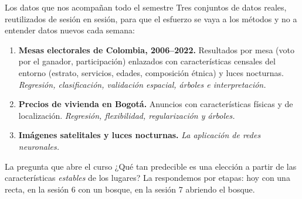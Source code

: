 \documentclass{beamer}
\newcommand{\1}{\mathbb{I}}
\begin{document}
\begin{frame}{Los datos que nos acompañan todo el semestre}
\small
Tres conjuntos de datos reales, reutilizados de sesión en sesión, para que el esfuerzo se vaya a los métodos y no a entender datos nuevos cada semana:
\pause
\begin{enumerate}\itemsep6pt
  \item \textbf{Mesas electorales de Colombia, 2006--2022.} Resultados por mesa (voto por el ganador, participación) enlazados con características censales del entorno (estrato, servicios, edades, composición étnica) y luces nocturnas. \emph{Regresión, clasificación, validación espacial, árboles e interpretación.} \pause
  \item \textbf{Precios de vivienda en Bogotá.} Anuncios con características físicas y de localización. \emph{Regresión, flexibilidad, regularización y árboles.} \pause
  \item \textbf{Imágenes satelitales y luces nocturnas.} \emph{La aplicación de redes neuronales.}
\end{enumerate}
\pause

\vspace{0.2cm}
\begin{block}{La pregunta que abre el curso}
¿Qué tan predecible es una elección a partir de las características \emph{estables} de los lugares? La respondemos por etapas: hoy con una recta, en la sesión 6 con un bosque, en la sesión 7 abriendo el bosque.
\end{block}
\end{frame}
\end{document}
